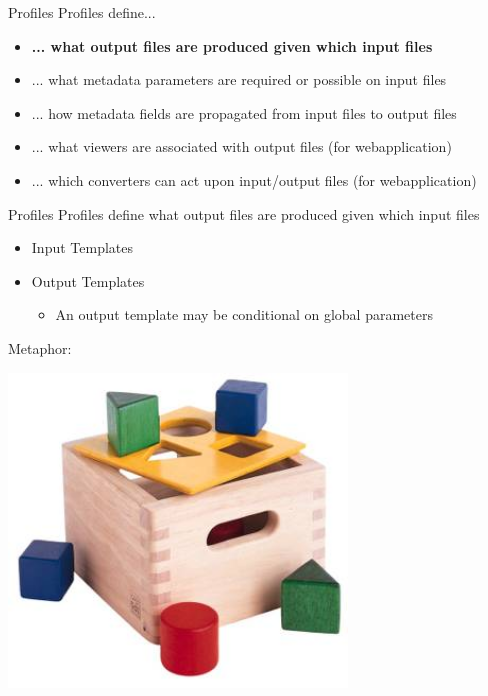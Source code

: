 \documentclass[compress]{beamer}
\begin{document}
\begin{frame}
    \begin{block}{Profiles}    
        Profiles define...
        \begin{itemize}
            \item \textbf{... what output files are produced given which input files}
            \item ... what metadata parameters are required or possible on input files
            \item ... how metadata fields are propagated from input files to output files
            \item ... what viewers are associated with output files (for webapplication)
            \item ... which converters can act upon input/output files (for webapplication)
        \end{itemize}        
    \end{block}
\end{frame}

\begin{frame}
    \begin{block}{Profiles}    
        Profiles define what output files are produced given which input files
        \begin{itemize}
            \item Input Templates
            \item Output Templates
            \begin{itemize}
                \item An output template may be conditional on global parameters
            \end{itemize}
        \end{itemize}        
    \end{block}
    
\end{frame}

\begin{frame}

Metaphor:
\begin{center}
\includegraphics[width=90.0mm]{blokkendoos.jpg}
\end{center}

\end{frame}
\end{document}
